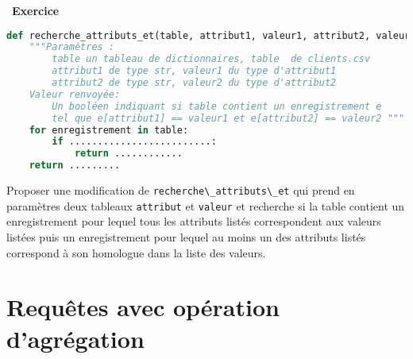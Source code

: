 \documentclass[
  11pt,
]{article}
\newcommand{\passthrough}[1]{#1}
\newcounter{exo}
\newenvironment{exercice}[1]
{\par \medskip   \addtocounter{exo}{1} \noindent  
\begin{bclogo}[arrondi =0.1,   noborder = true, logo=\bccrayon, marge=4]{~\textbf{Exercice} \textbf{\theexo} {\itshape #1} }  \par}
{
\end{bclogo}
 \par \bigskip }
\newcounter{def}
\begin{document}
\begin{exercice}{}
\begin{lstlisting}[language=Python]
def recherche_attributs_et(table, attribut1, valeur1, attribut2, valeur2):
    """Paramètres : 
        table un tableau de dictionnaires, table  de clients.csv
        attribut1 de type str, valeur1 du type d'attribut1
        attribut2 de type str, valeur2 du type d'attribut2
    Valeur renvoyée:
        Un booléen indiquant si table contient un enregistrement e
        tel que e[attribut1] == valeur1 et e[attribut2] == valeur2 """
    for enregistrement in table:
        if .........................:
            return ............
    return .........
\end{lstlisting}

Proposer une modification de
\passthrough{\lstinline!recherche\_attributs\_et!} qui prend en
paramètres deux tableaux \passthrough{\lstinline!attribut!} et
\passthrough{\lstinline!valeur!} et recherche si la table contient un
enregistrement pour lequel tous les attributs listés correspondent aux
valeurs listées puis un enregistrement pour lequel au moins un des
attributs listés correspond à son homologue dans la liste des valeurs.

\end{exercice}

\hypertarget{requuxeates-avec-opuxe9ration-dagruxe9gation}{%
\section{Requêtes avec opération
d'agrégation}\label{requuxeates-avec-opuxe9ration-dagruxe9gation}}
\end{document}
